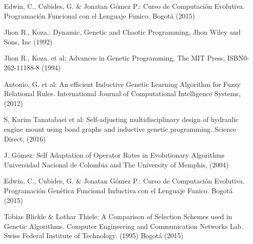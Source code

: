 \documentclass{llncs}
\begin{document}
\begin{thebibliography}{8}
%
Edwin, C., Cubides, G. \& Jonatan Gómez P.:
Curso de Computación Evolutiva. Programación Funcional con el Lenguaje Funico.
Bogotá (2015)

Jhon R., Koza.:
Dynamic, Genetic and Chaotic Programming,
Jhon Wiley and Sons, Inc (1992)

Jhon R., Koza. et al:
Advances in Genetic Programming, 
The MIT Press, ISBN0-262-11188-8 (1994)

Antonio, G. et al:
An efficient Inductive Genetic Learning Algorithm for Fuzzy Relational Rules.
International Journal of Computational Intelligence Systems, (2012)

S, Karim Tanatabaei et al:
Self-adjusting multidisciplinary design of hydraulic engine mount using bond graphs and inductive genetic programming.
Science Direct, (2016)

J. Gómez:
Self Adaptation of Operator Rates in Evolutionary Algorithms
Universidad Nacional de Colombia and The University of Memphis, (2004)

Edwin, C., Cubides, G. \& Jonatan Gómez P.:
Curso de Computación Evolutiva. Programación Genética Funcional Inductiva con el Lenguaje Funico.
Bogotá (2015)

Tobias Blickle \& Lothar Thiele:
A Comparison of Selection Schemes used in Genetic Algorithms.
Computer Engineering and Communication Networks Lab.
Swiss Federal Institute of Technology. (1995)
Bogotá (2015)

\end{thebibliography}
\end{document}
